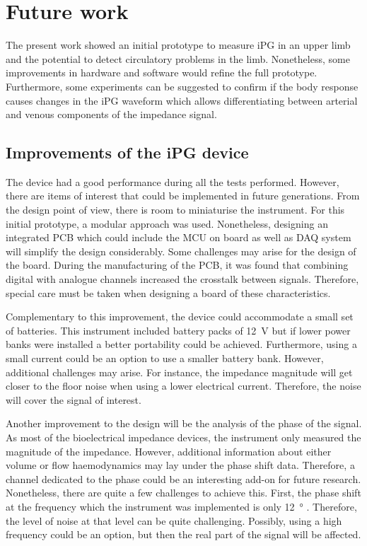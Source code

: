 \section{Future work}
The present work showed an initial prototype to measure iPG in an upper limb and the potential to detect circulatory problems in the limb. Nonetheless, some improvements in hardware and software would refine the full prototype. Furthermore, some experiments can be suggested to confirm if the body response causes changes in the iPG waveform which allows differentiating between arterial and venous components of the impedance signal. 

\subsection{Improvements of the iPG device}
The device had a good performance during all the tests performed. However, there are items of interest that could be implemented in future generations. From the design point of view, there is room to miniaturise the instrument. For this initial prototype, a modular approach was used. Nonetheless, designing an integrated PCB which could include the MCU on board as well as DAQ system will simplify the design considerably. Some challenges may arise for the design of the board. During the manufacturing of the PCB, it was found that combining digital with analogue channels increased the crosstalk between signals. Therefore, special care must be taken when designing a board of these characteristics. 

Complementary to this improvement, the device could accommodate a small set of batteries. This instrument included battery packs of \SI{12}{\volt} but if lower power banks were installed a better portability could be achieved. Furthermore, using a small current could be an option to use a smaller battery bank. However, additional challenges may arise. For instance, the impedance magnitude will get closer to the floor noise when using a  lower electrical current. Therefore, the noise will cover the signal of interest. 

Another improvement to the design will be the analysis of the phase of the signal. As most of the bioelectrical impedance devices, the instrument only measured the magnitude of the impedance. However, additional information about either volume or flow haemodynamics may lay under the phase shift data. Therefore, a channel dedicated to the phase could be an interesting add-on for future research. Nonetheless, there are quite a few challenges to achieve this. First, the phase shift at the frequency which the instrument was implemented is only \SI{12}{\degree} \cite{jaffrin1979quantitative}. Therefore, the level of noise at that level can be quite challenging. Possibly, using a high frequency could be an option, but then the real part of the signal will be affected.

